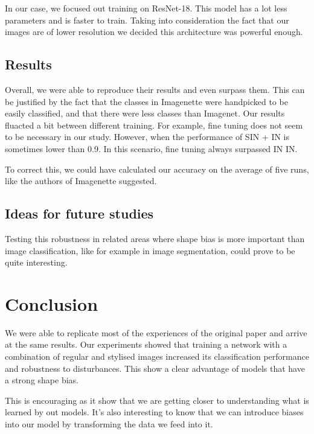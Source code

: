 \documentclass{article}
\begin{document}
In our case, we focused out training on ResNet-18. This model has a lot less parameters and is faster to train. Taking into consideration the fact that our images are of lower resolution we decided this architecture was powerful enough.

\subsection{Results}

Overall, we were able to reproduce their results and
even surpass them. This can be justified by the fact that the classes
in Imagenette were handpicked to be easily classified, and that there were less 
classes than Imagenet.
Our results fluacted a bit between different training. For example, fine tuning does not seem to be necessary 
in our study. However, when the performance of SIN + IN is sometimes lower than 0.9. In this scenario, fine tuning
always surpassed IN \texorpdfstring{\textrightarrow} .IN. \medskip \par 

\noindent
To correct this, we could have calculated our accuracy on the average of five runs, like the authors of Imagenette \cite{fastai2019}
suggested.

\subsection{Ideas for future studies}

Testing this robustness in related areas where shape bias is more important than image classification, like for example in image segmentation, could prove to be quite interesting.

\newpage
\section{Conclusion}

We were able to replicate most of the experiences of the original paper and arrive at the same results.
Our experiments showed that training a network with a combination of regular and stylised images increased its classification performance and robustness to disturbances.
This show a clear advantage of models that have a strong shape bias.

This is encouraging as it show that we are getting closer to understanding what is learned by out models. It's also interesting to know that we can introduce biases into our model by transforming the data we feed into it.


\newpage
\appendix



\end{document}

